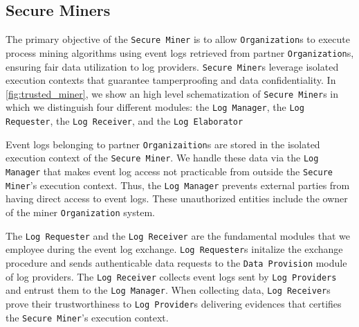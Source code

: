 \subsection{Secure Miners}
The primary objective of the \texttt{Secure Miner} is to allow \texttt{Organization}s to execute process mining algorithms using %
event logs retrieved from partner \texttt{Organization}s, ensuring fair data utilization to log providers. \texttt{Secure Miner}s leverage isolated execution contexts that guarantee tamperproofing and data confidentiality. In \cref{fig:trusted_miner}, we show an high level schematization of \texttt{Secure Miner}s in which we distinguish four different modules: the \texttt{Log Manager}, the \texttt{Log Requester}, the \texttt{Log Receiver}, and the \texttt{Log Elaborator}

Event logs belonging to partner \texttt{Organizaition}s are stored in the isolated execution context of the \texttt{Secure Miner}. We handle these data via the \texttt{Log Manager} that makes event log access not practicable from outside the \texttt{Secure Miner}'s execution context. Thus, the \texttt{Log Manager} prevents external parties from having direct access to event logs. These unauthorized entities include the owner of the miner \texttt{Organization} system. %

The \texttt{Log Requester} and the \texttt{Log Receiver} are the fundamental modules that we employee during the event log exchange. \texttt{Log Requester}s initalize the exchange procedure and sends authenticable data requests to the \texttt{Data Provision} module of log providers. The \texttt{Log Receiver} collects event logs sent by \texttt{Log Providers} and entrust them to the \texttt{Log Manager}. When collecting data, \texttt{Log Receiver}s prove their trustworthiness to \texttt{Log Provider}s delivering evidences that certifies the \texttt{Secure Miner}'s execution context.%

